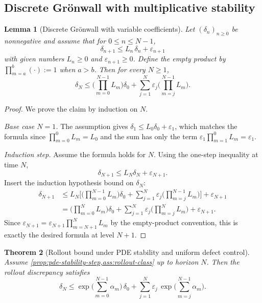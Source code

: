\documentclass{article}
\numberwithin{equation}{section}
\theoremstyle{plain}
\newtheorem{theorem}{Theorem}[section]
\newtheorem{lemma}[theorem]{Lemma}
\theoremstyle{definition}
\theoremstyle{remark}
\begin{document}
\subsection{Discrete Gr\"onwall with multiplicative stability}

\begin{lemma}[Discrete Gr\"onwall with variable coefficients]
\label{lem:discrete-gronwall}
Let $(\delta_n)_{n\ge 0}$ be nonnegative and assume that for $0\le n\le N-1$,
\[
\delta_{n+1}\le L_n\,\delta_n + \varepsilon_{n+1}
\]
with given numbers $L_n\ge 0$ and $\varepsilon_{n+1}\ge 0$.
Define the empty product by $\prod_{m=a}^{b}(\cdot):=1$ when $a>b$.
Then for every $N\ge 1$,
\[
\delta_N
\le
\Big(\prod_{m=0}^{N-1}L_m\Big)\delta_0
+
\sum_{j=1}^{N}\varepsilon_j\Big(\prod_{m=j}^{N-1}L_m\Big).
\]
\end{lemma}

\begin{proof}
We prove the claim by induction on $N$.

\emph{Base case $N=1$.}
The assumption gives $\delta_1\le L_0\delta_0+\varepsilon_1$, which matches the formula
since $\prod_{m=0}^{0}L_m=L_0$ and the sum has only the term
$\varepsilon_1\prod_{m=1}^{0}L_m=\varepsilon_1$.

\emph{Induction step.} Assume the formula holds for $N$.
Using the one-step inequality at time $N$,
\[
\delta_{N+1}\le L_N\delta_N+\varepsilon_{N+1}.
\]
Insert the induction hypothesis bound on $\delta_N$:
\begin{align*}
\delta_{N+1}
&\le L_N\Big[\Big(\prod_{m=0}^{N-1}L_m\Big)\delta_0
+
\sum_{j=1}^{N}\varepsilon_j\Big(\prod_{m=j}^{N-1}L_m\Big)\Big]+\varepsilon_{N+1} \\
&=
\Big(\prod_{m=0}^{N}L_m\Big)\delta_0
+
\sum_{j=1}^{N}\varepsilon_j\Big(\prod_{m=j}^{N}L_m\Big)
+\varepsilon_{N+1}.
\end{align*}
Since $\varepsilon_{N+1}=\varepsilon_{N+1}\prod_{m=N+1}^{N}L_m$ by the empty-product convention,
this is exactly the desired formula at level $N+1$.
\end{proof}

\begin{theorem}[Rollout bound under PDE stability and uniform defect control]
\label{thm:rollout}
Assume \cref{prop:pde-stability-step,ass:rollout-class} up to horizon $N$.
Then the rollout discrepancy satisfies
\[
\delta_N
\le
\exp\Big(\sum_{m=0}^{N-1}\alpha_m\Big)\,\delta_0
+
\sum_{j=1}^{N}\varepsilon_j\,
\exp\Big(\sum_{m=j}^{N-1}\alpha_m\Big).
\]
\end{theorem}
\end{document}
